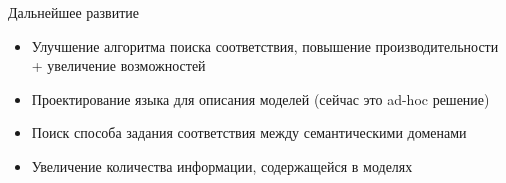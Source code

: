 \documentclass[12pt]{beamer}
\begin{document}
{
\begin{frame}[fragile]{Дальнейшее развитие}
	\begin{mybox}[]
	\begin{itemize}
		\item Улучшение алгоритма поиска соответствия, повышение производительности + увеличение возможностей
		\item Проектирование языка для описания моделей (сейчас это ad-hoc решение)
		\item Поиск способа задания соответствия между семантическими доменами
		\item Увеличение количества информации, содержащейся в моделях
	\end{itemize}
	\end{mybox}
\end{frame}
}
\end{document}
